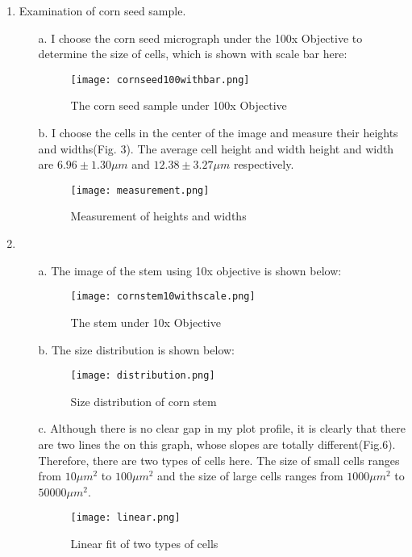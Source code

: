 \documentclass[12pt]{article}
\begin{document}
\begin{enumerate}
    \item Examination of corn seed sample.  
    \begin{enumerate}
        \item[a.] I choose the corn seed micrograph under the 100x Objective to determine the size of cells, which is shown with scale bar here:
        \begin{figure}[H]
            \centering
            \texttt{[image: cornseed100withbar.png]}
            \caption{The corn seed sample under 100x Objective}
            \label{fig:my_label}
        \end{figure}
        \item[b.] I choose the cells in the center of the image and measure their heights and widths(Fig. 3). The average cell height and width height and width are {\boldmath$6.96\pm 1.30 \mu m$} and {\boldmath$12.38\pm 3.27 \mu m$} respectively.
        \begin{figure}[H]
            \centering
            \texttt{[image: measurement.png]}
            \caption{Measurement of heights and widths}
            \label{fig:my_label}
        \end{figure}
        
    \end{enumerate}
    
    \item 
    \begin{enumerate}
        \item[a.] The image of the stem using 10x objective is shown below:
        
        \begin{figure}[H]
            \centering
            \texttt{[image: cornstem10withscale.png]}
            \caption{The stem under 10x Objective}
            \label{fig:my_label}
        \end{figure}
    
        \item[b.] The size distribution is shown below:
        \begin{figure}[H]
            \centering
            \texttt{[image: distribution.png]}
            \caption{Size distribution of corn stem}
            \label{fig:my_label}
        \end{figure}
        
        \item[c.] Although there is no clear gap in my plot profile, it is clearly that there are two lines the on this graph, whose slopes are totally different(Fig.6). Therefore, there are two types of cells here. The size of small cells ranges from $10 \mu m^2$ to $100 \mu m^2 $ and the size of large cells ranges from $1000 \mu m^2$ to $50000 \mu m^2$. 
        \begin{figure}[H]
            \centering
            \texttt{[image: linear.png]}
            \caption{Linear fit of two types of cells}
            \label{fig:my_label}
        \end{figure}
    \end{enumerate}
        
    
\end{enumerate}
\end{document}
